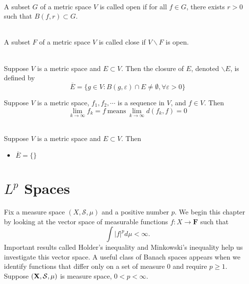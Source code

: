 \documentclass[12pt]{book}
\begin{document}
\begin{definition} \ \\
A subset $G$ of a metric space $V$ is called open if for all $f\in G$, there exists $r >0$ such that $B(f,r)\subset G$.
\end{definition}

\begin{definition} \ \\
A subset $F$ of a metric space $V$ is called close if $V\backslash F$ is open.
\end{definition}

\begin{definition}[closure] \ \\
Suppose $V$ is a metric space and $E\subset V$. Then the closure of $E$, denoted $\backslash E$, is defined by
$$
\overline{E} = \{g \in V: B(g,\varepsilon)\cap E \neq \emptyset,  \forall \varepsilon > 0\}
$$
\end{definition}

\begin{definition}[Limits in V]
Suppose $V$ is a metric space, $f_1,f_2,\cdots$ is a sequence in $V$, and $f\in V$. Then
	$$
\lim_{k \to \infty}f_k =f \ \text{means} \ \lim_{k \to \infty}d(f_k,f)=0
	$$
\end{definition}

\begin{theorem}[closure] \ \\
Suppose $V$ is a metric space and $E \subset V$. Then
\begin{itemize}
	\item $\overline{E}=\{ \}$
\end{itemize}	
\end{theorem}








\chapter{$L^p$ Spaces}
Fix a measure space $(X, \mathcal{S}, \mu)$ and a positive number $p$. We begin this chapter by looking at the vector space of measurable functions $f: X \rightarrow \mathbf{F}$ such that
$$
\int|f|^p d \mu<\infty .
$$
Important results called Holder's inequality and Minkowski's inequality help us investigate this vector space. A useful class of Banach spaces appears when we identify functions that differ only on a set of measure 0 and require $p \geq 1$.
\newpage
Suppose $(\mathbf{X},\mathcal{S},\mu)$ is measure space, $0<p<\infty$.
\begin{definition}
	
\end{definition}
\end{document}
